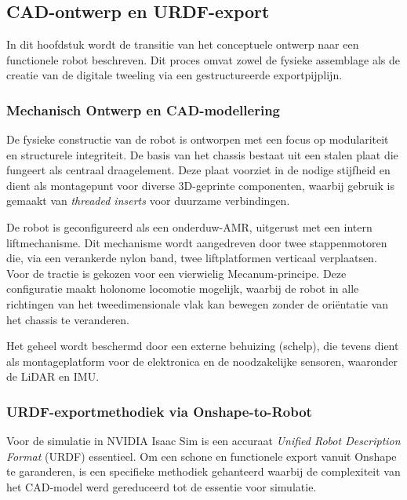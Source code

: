 \chapter{}%
\label{ch:realisatie}

\section{CAD-ontwerp en URDF-export}
In dit hoofdstuk wordt de transitie van het conceptuele ontwerp naar een functionele robot beschreven. Dit proces omvat zowel de fysieke assemblage als de creatie van de digitale tweeling via een gestructureerde exportpijplijn.

\subsection{Mechanisch Ontwerp en CAD-modellering}
De fysieke constructie van de robot is ontworpen met een focus op modulariteit en structurele integriteit. De basis van het chassis bestaat uit een stalen plaat die fungeert als centraal draagelement. Deze plaat voorziet in de nodige stijfheid en dient als montagepunt voor diverse 3D-geprinte componenten, waarbij gebruik is gemaakt van \textit{threaded inserts} voor duurzame verbindingen.

De robot is geconfigureerd als een onderduw-AMR, uitgerust met een intern liftmechanisme. Dit mechanisme wordt aangedreven door twee stappenmotoren die, via een verankerde nylon band, twee liftplatformen verticaal verplaatsen. Voor de tractie is gekozen voor een vierwielig Mecanum-principe. Deze configuratie maakt holonome locomotie mogelijk, waarbij de robot in alle richtingen van het tweedimensionale vlak kan bewegen zonder de oriëntatie van het chassis te veranderen.

Het geheel wordt beschermd door een externe behuizing (schelp), die tevens dient als montageplatform voor de elektronica en de noodzakelijke sensoren, waaronder de LiDAR en IMU.

\subsection{URDF-exportmethodiek via Onshape-to-Robot}
Voor de simulatie in NVIDIA Isaac Sim is een accuraat \textit{Unified Robot Description Format} (URDF) essentieel. Om een schone en functionele export vanuit Onshape te garanderen, is een specifieke methodiek gehanteerd waarbij de complexiteit van het CAD-model werd gereduceerd tot de essentie voor simulatie.

